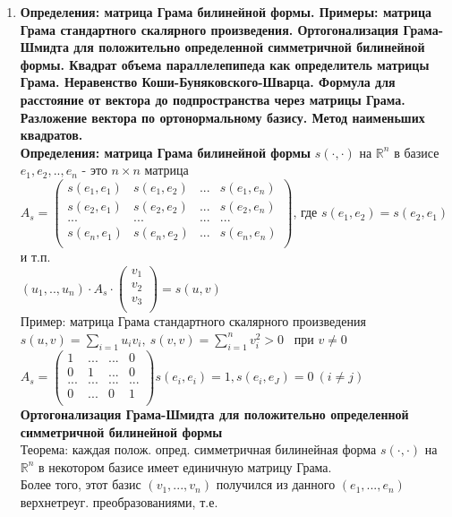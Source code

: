 \documentclass[12pt, oneside]{book}
\theoremstyle{definition}
\newcommand{\bb}[1]{\mathbb{#1}}
\begin{document}
\begin{enumerate}
\item \textbf{Определения: матрица Грама билинейной формы. Примеры: матрица Грама стандартного скалярного произведения. Ортогонализация Грама-Шмидта для положительно определенной симметричной билинейной формы. Квадрат объема параллелепипеда как определитель матрицы Грама. Неравенство Коши-Буняковского-Шварца. Формула для расстояние от вектора до подпространства через матрицы Грама. Разложение вектора по ортонормальному базису. Метод наименьших квадратов.}\\
\textbf{Определения: матрица Грама билинейной формы} $ s(\cdot,\cdot)$ на $\bb{R}^n$ в базисе $e_1, e_2,..,e_n$ - это $n\times n$ матрица\\
$A_s=\begin{pmatrix}
s(e_1,e_1) & s(e_1,e_2) & ... & s(e_1,e_n)\\
s(e_2,e_1) & s(e_2,e_2) & ... & s(e_2,e_n)\\
... & ... & ... & ...\\
s(e_n,e_1) & s(e_n,e_2) & ... & s(e_n,e_n)\\
\end{pmatrix}$, где $s(e_1,e_2) = s(e_2,e_1)$ и т.п.\\
$(u_1, .., u_n)\cdot A_s \cdot \begin{pmatrix}
v_1\\
v_2\\
v_3\\
\end{pmatrix}=s(u,v)$\\
Пример: матрица Грама стандартного скалярного произведения $s(u,v)=\sum_{i=1} u_iv_i, \  s(v,v)=\sum_{i=1}^{n} v_i^2 >0$ \  при $v\neq 0$\\
$A_s=\begin{pmatrix}
1 & ... & ... & 0\\
0 & 1 & ... & 0\\
... & ... & ... & ...\\
0 & ... & 0 & 1\\
\end{pmatrix} s(e_i,e_i)=1, s(e_i,e_J)=0 \ (i\neq j)$\\
\textbf{Ортогонализация Грама-Шмидта для положительно определенной симметричной билинейной формы}\\
Теорема: каждая полож. опред. симметричная билинейная форма $s(\cdot,\cdot)$ на $\bb{R}^{n}$ в некотором базисе имеет единичную матрицу Грама.\\
Более того, этот базис $(v_1, ..., v_n)$ получился из данного $(e_1, ..., e_n)$ верхнетреуг. преобразованиями, т.е.\\

\end{enumerate}
\end{document}
